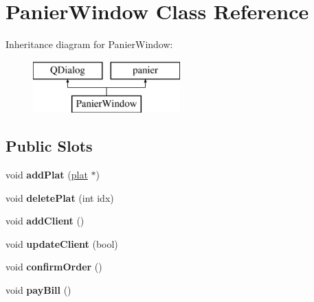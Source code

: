 \hypertarget{class_panier_window}{}\section{Panier\+Window Class Reference}
\label{class_panier_window}
Inheritance diagram for Panier\+Window\+:\begin{figure}[H]
\begin{center}
\leavevmode
\includegraphics[height=2.000000cm]{class_panier_window}
\end{center}
\end{figure}
\subsection*{Public Slots}
\begin{DoxyCompactItemize}
\item 
void {\bfseries add\+Plat} (\hyperlink{classplat}{plat} $\ast$)\hypertarget{class_panier_window_ad010670d90a8c8bd5c1937dddc1517be}{}\label{class_panier_window_ad010670d90a8c8bd5c1937dddc1517be}

\item 
void {\bfseries delete\+Plat} (int idx)\hypertarget{class_panier_window_a9cad686a2a08a809a593ac58df259655}{}\label{class_panier_window_a9cad686a2a08a809a593ac58df259655}

\item 
void {\bfseries add\+Client} ()\hypertarget{class_panier_window_ad80148d8378357e609b8bfb1e7f92d08}{}\label{class_panier_window_ad80148d8378357e609b8bfb1e7f92d08}

\item 
void {\bfseries update\+Client} (bool)\hypertarget{class_panier_window_a8bcf2fe31a62a0ddc71a06dc32d5b54b}{}\label{class_panier_window_a8bcf2fe31a62a0ddc71a06dc32d5b54b}

\item 
void {\bfseries confirm\+Order} ()\hypertarget{class_panier_window_aacc7f49aa43eed49c85e340b184135ac}{}\label{class_panier_window_aacc7f49aa43eed49c85e340b184135ac}

\item 
void {\bfseries pay\+Bill} ()\hypertarget{class_panier_window_a8c2d6336d1d3bb4fb3041fb0e8c591e3}{}\label{class_panier_window_a8c2d6336d1d3bb4fb3041fb0e8c591e3}

\end{DoxyCompactItemize}
